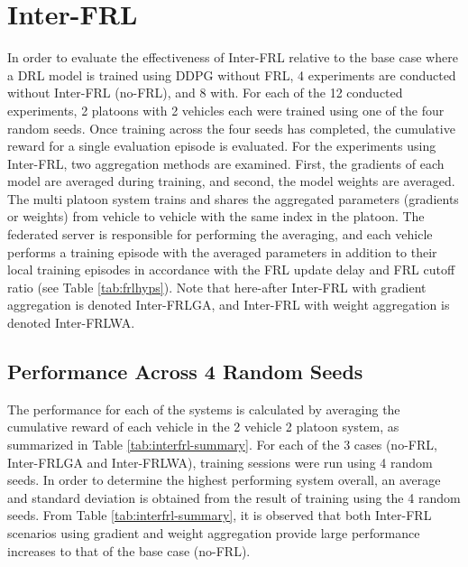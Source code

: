 \section{Inter-FRL}
In order to evaluate the effectiveness of Inter-FRL relative to the base case where a 
DRL model is trained using DDPG without FRL, 4 experiments are conducted without 
Inter-FRL (no-FRL), and 8 with.  For each of the 12 conducted experiments, 2 platoons 
with 2 vehicles each were trained using one of the four random seeds.  Once training 
across the four seeds has completed, the cumulative reward for a single evaluation 
episode is evaluated.  For the experiments using Inter-FRL, two aggregation methods 
are examined.  First, the gradients of each model are averaged during training, and 
second, the model weights are averaged.  The multi platoon system trains and shares 
the aggregated parameters (gradients or weights) from vehicle to vehicle with the same 
index in the platoon. The federated server is responsible for performing the averaging, 
and each vehicle performs a training episode with the averaged parameters in addition 
to their local training episodes in accordance with the FRL update delay and FRL 
cutoff ratio (see Table \ref{tab:frlhyps}). Note that here-after Inter-FRL with gradient 
aggregation is denoted Inter-FRLGA, and Inter-FRL with weight aggregation is denoted 
Inter-FRLWA.


\subsection{Performance Across 4 Random Seeds}
The performance for each of the systems is calculated by averaging the cumulative reward 
of each vehicle in the 2 vehicle 2 platoon system, as summarized in Table 
\ref{tab:interfrl-summary}.  For each of the 3 cases (no-FRL, Inter-FRLGA and Inter-FRLWA), 
training sessions were run using 4 random seeds.  In order to determine the highest 
performing system overall, an average and standard deviation is obtained from the result 
of training using the 4 random seeds. From Table \ref{tab:interfrl-summary}, it is 
observed that both Inter-FRL scenarios using gradient and weight aggregation provide 
large performance increases to that of the base case (no-FRL).  

